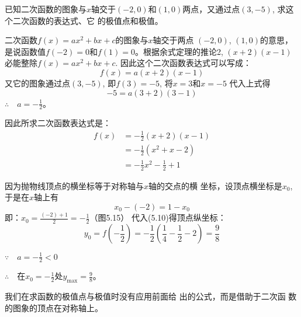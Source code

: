 \begin{example}
    已知二次函数的图象与$x$轴交于$(-2,0)$和$(1,
0)$两点，又通过点$(3,-5)$, 求这个二次函数的表达式、它
的极值点和极值。
\end{example}

\begin{solution}
二次函数$f(x)=ax^2+bx+c$的图象与$x$轴交于两点
$(-2,0)$, $(1,0)$的意思，是说函数值$f(-2)=0$和$f(1)=
0$。根据余式定理的推论2, $(x+2)(x-1)$必能整除$f(x)=
ax^2+bx+c$. 因此这个二次函数表达式可以写成：
\[f(x)=a(x+2)(x-1)\]
又它的图象通过点$(3,-5)$, 即$f(3)=-5$, 将$x=3$和$x=-5$
代入上式得
\[-5=a(3+2)(3-1)\]
$\therefore\quad a=-\frac{1}{2}$。

因此所求二次函数表达式是：
\begin{equation}
    \begin{split}
        f(x)&=-\frac{1}{2}(x+2)(x-1)\\
        &=-\frac{1}{2}(x^2+x-2)\\
        &=-\frac{1}{2}x^2-\frac{1}{2}+1
    \end{split}
\end{equation}

因为抛物线顶点的横坐标等于对称轴与$x$轴的交点的横
坐标，设顶点横坐标是$x_0$, 于是在$x$轴上有
    \[x_0-(-2)=1-x_0\]
    即：$x_0=\frac{(-2)+1}{2}=-\frac{1}{2}$（图5.15）
代入(5.10)得顶点纵坐标：
\[y_0=f\left(-\frac{1}{2}\right)=-\frac{1}{2}\left(\frac{1}{4}-\frac{1}{2}-2\right)=\frac{9}{8}\]

$\because\quad a=-\frac{1}{2}<0$

$\therefore\quad $在$x_0=-\frac{1}{2}$处$y_{\max}=\frac{9}{8}$。

\begin{figure}[htp]
    \centering

    \caption{}
\end{figure}
\end{solution}

\begin{rmk}
    我们在求函数的极值点与极值时没有应用前面给
出的公式，而是借助于二次函
数的图象的顶点在对称轴上。
\end{rmk}

